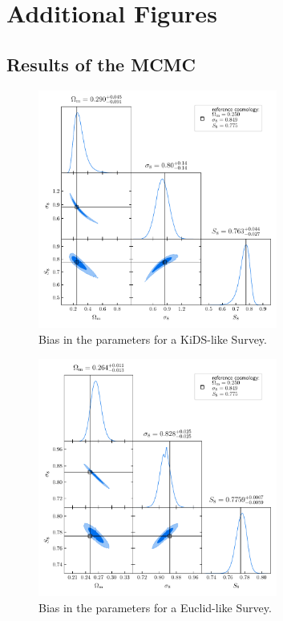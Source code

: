 \section{Additional Figures}
\subsection{Results of the MCMC}
\begin{figure}[h]
\centering
	\includegraphics[width=0.7\textwidth]{images/obscorr.pdf}
	\caption{Bias in the parameters for a KiDS-like Survey.}
	\label{fig:mcmc_kids}
\end{figure}  
\begin{figure}[h]
\centering
	\includegraphics[width=0.7\textwidth]{images/euclid.pdf}
	\caption{Bias in the parameters for a Euclid-like Survey.}
	\label{fig:mcmc_euclid}
\end{figure}  
